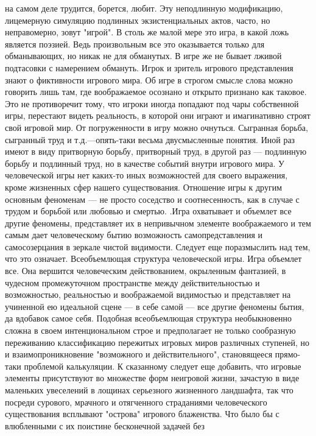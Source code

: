 \documentclass[12pt]{article}
\begin{document}
на самом деле трудится, борется, любит. Эту неподлинную модификацию, лицемерную симуляцию подлинных
экзистенциальных актов, часто, но неправомерно, зовут "игрой". В столь же малой мере это игра, в какой ложь  
является  поэзией.  Ведь  произвольным  все  это  оказывается  только  для  обманывающих,  но  никак  не  для
обманутых.  В  игре  же  не  бывает  лживой  подтасовки  с  намерением  обмануть.  Игрок  и  зритель  игрового
представления знают о фиктивности игрового мира. Об игре в строгом смысле слова можно говорить лишь там,
где воображаемое осознано и открыто признано как таковое. Это не противоречит тому, что игроки иногда
попадают под чары собственной игры, перестают видеть реальность, в которой они играют и имагинативно
строят свой игровой мир. От погруженности в игру можно очнуться. Сыгранная борьба, сыгранный труд и т.д.---опять-таки весьма двусмысленные понятия. Иной раз имеют в виду притворную борьбу, притворный труд, в
другой  раз  ---  подлинную  борьбу  и  подлинный  труд,  но  в  качестве  событий  внутри  игрового  мира.  У
человеческой игры нет каких-то иных возможностей для своего выражения, кроме жизненных сфер нашего
существования. Отношение игры к другим основным феноменам --- не просто соседство и соотнесенность, как в
случае с трудом и борьбой  или любовью  и  смертью.  .Игра  охватывает  и  объемлет все другие феномены,
представляет их в непривычном элементе воображаемого и тем самым дает человеческому бытию возможность
самопредставления и самосозерцания в зеркале чистой видимости. Следует еще поразмыслить над тем, что это
означает.
Всеобъемлющая структура человеческой игры.
Игра  объемлет  все.  Она  вершится  человеческим  действованием,  окрыленным  фантазией,  в  чудесном
промежуточном  пространстве  между  действительностью  и  возможностью,  реальностью  и  воображаемой
видимостью и представляет на учиненной ею идеальной сцене --- в себе самой --- все другие феномены бытия, да
вдобавок самое себя. Подобная всеобъемлющая структура необыкновенно сложна в своем интенциональном
строе  и  предполагает  не  только  сообразную  переживанию  классификацию  пережитых  игровых  миров
различных ступеней, но и взаимопроникновение "возможного и действительного", становящееся прямо-таки
проблемой  калькуляции.  К  сказанному  следует  еще  добавить,  что  игровые  элементы  присутствуют  во
множестве форм неигровой жизни, зачастую в виде маленьких увеселений в лощинах серьезного жизненного
ландшафта,  так  что  посреди  сурового,  мрачного  и  отягченного  страданиями  человеческого  существования
всплывают "острова" игрового блаженства. Что было бы с влюбленными с их поистине бесконечной задачей без
\end{document}
